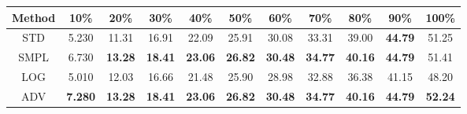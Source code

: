 \documentclass{standalone}
\begin{document}
\begin{tabular}{c|cccccccccc}
      \toprule
      Method & 10\% & 20\% & 30\% & 40\% & 50\% & 60\% & 70\% & 80\% & 90\% & 100\% \\
      \midrule
STD & 5.230 & 11.31 & 16.91 & 22.09 & 25.91 & 30.08 & 33.31 & 39.00 & \textbf{44.79} & 51.25\\
SMPL & 6.730 & \textbf{13.28} & \textbf{18.41} & \textbf{23.06} & \textbf{26.82} & \textbf{30.48} & \textbf{34.77} & \textbf{40.16} & \textbf{44.79} & 51.41\\
LOG & 5.010 & 12.03 & 16.66 & 21.48 & 25.90 & 28.98 & 32.88 & 36.38 & 41.15 & 48.20\\
ADV & \textbf{7.280} & \textbf{13.28} & \textbf{18.41} & \textbf{23.06} & \textbf{26.82} & \textbf{30.48} & \textbf{34.77} & \textbf{40.16} & \textbf{44.79} & \textbf{52.24}\\
  \bottomrule
\end{tabular}
\end{document}
